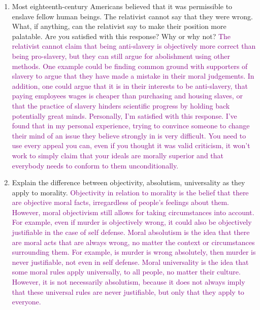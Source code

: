 \documentclass[12pt]{article}
\newcommand{\ans}[1]{\textcolor{purple}{#1}}
\begin{document}
\begin{enumerate}
    \item Most eighteenth-century Americans believed that it was permissible to enslave fellow human beings. The relativist cannot say that they were wrong. What, if anything, can the relativist say to make their position more palatable. Are you satisfied with this response? Why or why not? \ans{The relativist cannot claim that being anti-slavery is objectively more correct than being pro-slavery, but they can still argue for abolishment using other methods. One example could be finding common ground with supporters of slavery to argue that they have made a mistake in their moral judgements. In addition, one could argue that it is in their interests to be anti-slavery, that paying employees wages is cheaper than purchasing and housing slaves, or that the practice of slavery hinders scientific progress by holding back potentially great minds. Personally, I'm satisfied with this response. I've found that in my personal experience, trying to convince someone to change their mind of an issue they believe strongly in is very difficult. You need to use every appeal you can, even if you thought it was valid criticism, it won't work to simply claim that your ideals are morally superior and that everybody needs to conform to them unconditionally.}

    \item Explain the difference between objectivity, absolutism, universality as they apply to morality. \ans{Objectivity in relation to morality is the belief that there are objective moral facts, irregardless of people's feelings about them. However, moral objectivism still allows for taking circumstances into account. For example, even if murder is objectively wrong, it could also be objectively justifiable in the case of self defense. Moral absolutism is the idea that there are moral acts that are always wrong, no matter the context or circumstances surrounding them. For example, is murder is wrong absolutely, then murder is never justifiable, not even in self defense. Moral universality is the idea that some moral rules apply universally, to all people, no matter their culture. However, it is not necessarily absolutism, because it does not always imply that these universal rules are never justifiable, but only that they apply to everyone.}


\end{enumerate}
\end{document}
